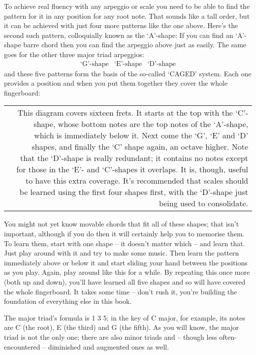 \documentclass[english]{./gbook}
\begin{document}
\begin{large}
To achieve real fluency with any arpeggio or scale you need to be able to find the pattern for it in any position for any root note. That sounds like a tall order, but it can be achieved with just four more patterns like the one above. Here's the second such pattern, colloquially known as the `A'-shape:
If you can find an `A'-shape barre chord then you can find the arpeggio above just as easily. The same goes for the other three major triad arpeggios:
\[
\begin{array}{ccc}
	\text{`G'-shape} & \text{`E'-shape} & \text{`D'-shape}
\end{array}
\]
and these five patterns form the basis of the so-called `CAGED' system. Each one provides a position and when you put them together they cover the whole fingerboard:\\
\begin{tabular}{rr}
& 
\parbox[b]{10cm}{
This diagram covers sixteen frets. It starts at the top with the `C'-shape, whose bottom notes are the top notes of the `A'-shape, which is immediately below it. Next come the `G', `E' and `D' shapes, and finally the `C' shape again, an octave higher. Note that the `D'-shape is really redundant; it contains no notes except for those in the `E'- and `C'-shapes it overlaps. It is, though, useful to have this extra coverage. It's recommended that scales should be learned using the first four shapes first, with the `D'-shape just being used to consolidate.
\rule{0pt}{6ex} 
}
\end{tabular}

You might not yet know movable chords that fit all of these shapes; that isn't important, although if you do then it will certainly help you to memorise them. To learn them, start with one shape -- it doesn't matter which -- and learn that. Just play around with it and try to make some music. Then learn the pattern immediately above or below it and start sliding your hand between the positions as you play. Again, play around like this for a while. By repeating this once more (both up and down), you'll have learned all five shapes and so will have covered the whole fingerboard. It takes some time -- don't rush it, you're building the foundation of everything else in this book.

The major triad's formula is 1 3 5; in the key of C major, for example, its notes are C (the root), E (the third) and G (the fifth). As you will know, the major triad is not the only one; there are also minor triads and -- though less often-encountered -- diminished and augmented ones as well.


\end{large}
\end{document}
